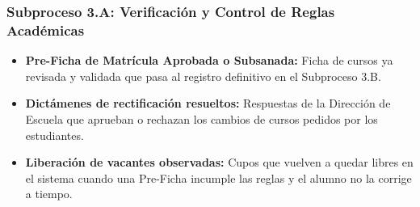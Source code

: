 \subsubsection{Subproceso 3.A: Verificación y Control de Reglas Académicas}

\begin{itemize}
    \item \textbf{Pre-Ficha de Matrícula Aprobada o Subsanada:} Ficha de cursos ya revisada y validada que pasa al registro definitivo en el Subproceso 3.B.

    \item \textbf{Dictámenes de rectificación resueltos:} Respuestas de la Dirección de Escuela que aprueban o rechazan los cambios de cursos pedidos por los estudiantes.

    \item \textbf{Liberación de vacantes observadas:} Cupos que vuelven a quedar libres en el sistema cuando una Pre-Ficha incumple las reglas y el alumno no la corrige a tiempo.
\end{itemize}
